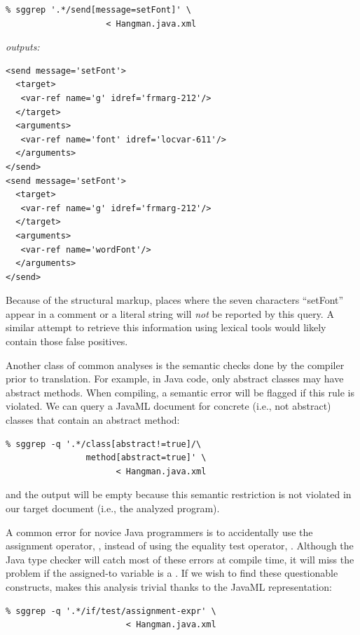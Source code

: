 \documentclass{article}
\begin{document}
\begin{multicols}{2}
\begin{verbatim}
% sggrep '.*/send[message=setFont]' \
                    < Hangman.java.xml 
\end{verbatim}

\noindent\emph{outputs:}
{\small
\begin{verbatim}
<send message='setFont'>
  <target>
   <var-ref name='g' idref='frmarg-212'/>
  </target>
  <arguments>
   <var-ref name='font' idref='locvar-611'/>
  </arguments>
</send>
<send message='setFont'>
  <target>
   <var-ref name='g' idref='frmarg-212'/>
  </target>
  <arguments>
   <var-ref name='wordFont'/>
  </arguments>
</send>
\end{verbatim}
}

\noindent Because of the structural markup, places where the seven characters
``setFont'' appear in a comment or a literal string will \emph{not} be reported by
this query.  A similar attempt to retrieve this information using lexical tools would 
likely contain those false positives.

Another class of common analyses is the semantic checks done by the
compiler prior to translation.  For example, in Java code, only abstract
classes may have abstract methods.  When compiling, a semantic error
will be flagged if this rule is violated.  We can query a JavaML document
for concrete (i.e., not abstract) classes that contain an abstract method:

{\small
\begin{verbatim}
% sggrep -q '.*/class[abstract!=true]/\
                method[abstract=true]' \
                      < Hangman.java.xml
\end{verbatim}
}

\noindent and the output will be empty because this semantic restriction is not
violated in our target document (i.e., the analyzed program).

A common error for novice Java programmers is to accidentally use the
assignment operator, \smtexttt{=}, instead of using the equality test
operator, \smtexttt{==}.  Although the Java type checker will catch
most of these errors at compile time, it will miss the problem if
the assigned-to variable is a \smtexttt{boolean}. If we wish to find these
questionable constructs, \smtexttt{sggrep} makes this analysis
trivial thanks to the JavaML representation:

{\small
\begin{verbatim}
% sggrep -q '.*/if/test/assignment-expr' \
                        < Hangman.java.xml
\end{verbatim}
}


\end{multicols}
\end{document}
